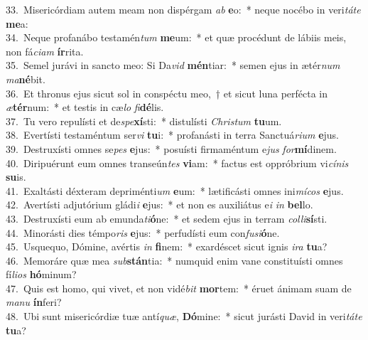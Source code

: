 {33.~}Misericórdiam autem meam non dispérgam \textit{ab} \textbf{e}o:~* neque nocébo in veri\textit{tá}\textit{te} \textbf{me}a:\\
{34.~}Neque profanábo testamén\textit{tum} \textbf{me}um:~* et quæ procédunt de lábiis meis, non fá\textit{ci}\textit{am} \textbf{ír}rita.\\
{35.~}Semel jurávi in sancto meo: Si Da\textit{vid} \textbf{mén}tiar:~* semen ejus in ætér\textit{num} \textit{ma}\textbf{né}bit.\\
{36.~}Et thronus ejus sicut sol in conspéctu meo,~† et sicut luna perfécta in \textit{æ}\textbf{tér}num:~* et testis in cæ\textit{lo} \textit{fi}\textbf{dé}lis.\\
{37.~}Tu vero repulísti et de\textit{spe}\textbf{xí}sti:~* distulísti \textit{Chri}\textit{stum} \textbf{tu}um.\\
{38.~}Evertísti testaméntum ser\textit{vi} \textbf{tu}i:~* profanásti in terra Sanctuá\textit{ri}\textit{um} \textbf{e}jus.\\
{39.~}Destruxísti omnes se\textit{pes} \textbf{e}jus:~* posuísti firmaméntum e\textit{jus} \textit{for}\textbf{mí}dinem.\\
{40.~}Diripuérunt eum omnes transeún\textit{tes} \textbf{vi}am:~* factus est oppróbrium vi\textit{cí}\textit{nis} \textbf{su}is.\\
{41.~}Exaltásti déxteram depriménti\textit{um} \textbf{e}um:~* lætificásti omnes ini\textit{mí}\textit{cos} \textbf{e}jus.\\
{42.~}Avertísti adjutórium gládi\textit{i} \textbf{e}jus:~* et non es auxiliátus e\textit{i} \textit{in} \textbf{bel}lo.\\
{43.~}Destruxísti eum ab emunda\textit{ti}\textbf{ó}ne:~* et sedem ejus in terram \textit{col}\textit{li}\textbf{sí}sti.\\
{44.~}Minorásti dies témpo\textit{ris} \textbf{e}jus:~* perfudísti eum con\textit{fu}\textit{si}\textbf{ó}ne.\\
{45.~}Usquequo, Dómine, avértis \textit{in} \textbf{fi}nem:~* exardéscet sicut ignis \textit{i}\textit{ra} \textbf{tu}a?\\
{46.~}Memoráre quæ mea \textit{sub}\textbf{stán}tia:~* numquid enim vane constituísti omnes fí\textit{li}\textit{os} \textbf{hó}minum?\\
{47.~}Quis est homo, qui vivet, et non vidé\textit{bit} \textbf{mor}tem:~* éruet ánimam suam de \textit{ma}\textit{nu} \textbf{ín}feri?\\
{48.~}Ubi sunt misericórdiæ tuæ antí\textit{quæ}, \textbf{Dó}mine:~* sicut jurásti David in veri\textit{tá}\textit{te} \textbf{tu}a?\\

